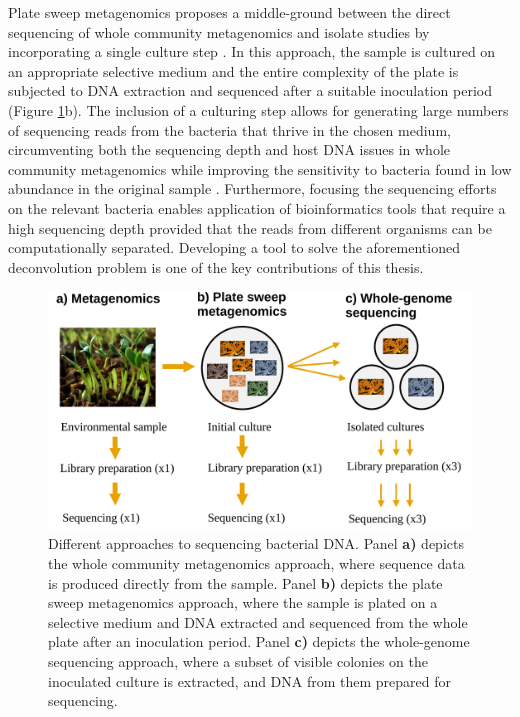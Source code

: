 \documentclass[officiallayout]{tktla}
\let\svthefootnote\thefootnote
\begin{document}
Plate sweep metagenomics proposes a middle-ground between the direct
sequencing of whole community metagenomics and isolate studies by incorporating a
single culture step \citep{maklin_high-resolution_2021}. In this
approach, the sample is cultured on an appropriate selective medium
and the entire complexity of the plate is subjected to DNA extraction
and sequenced after a suitable inoculation period (Figure
\ref{fig:microbiome-sampling-methods}b). The inclusion of a culturing
step allows for generating large numbers of sequencing reads from the
bacteria that thrive in the chosen medium, circumventing both the
sequencing depth and host DNA issues in whole community metagenomics while
improving the sensitivity to bacteria found in low abundance in the
original sample \citep{whelan2020culture,
  tonkin-hill_pneumococcal_2022, zhang2022using}. Furthermore, focusing the sequencing
efforts on the relevant bacteria enables application of bioinformatics
tools that require a high sequencing depth provided that the reads
from different organisms can be computationally separated. Developing
a tool to solve the aforementioned deconvolution problem is one of the
key contributions of this thesis.
\addtocounter{footnote}{-1}\let\thefootnote\svthefootnote
\begin{figure}[!t]
    \centering
    \includegraphics[width=\textwidth,keepaspectratio]{img/sampling/microbiome_sampling_methods.pdf}
    \caption{Different approaches to sequencing bacterial DNA. Panel
      \textbf{a)} depicts the whole community metagenomics approach, where
      sequence data is produced directly from the sample. Panel
      \textbf{b)} depicts the plate sweep metagenomics approach, where
      the sample is plated on a selective medium and DNA extracted and
      sequenced from the whole plate after an inoculation
      period. Panel \textbf{c)} depicts the whole-genome sequencing
      approach, where a subset of visible colonies on the inoculated
      culture is extracted, and DNA from them prepared for
      sequencing.}
    \label{fig:microbiome-sampling-methods}
\end{figure}
\end{document}
